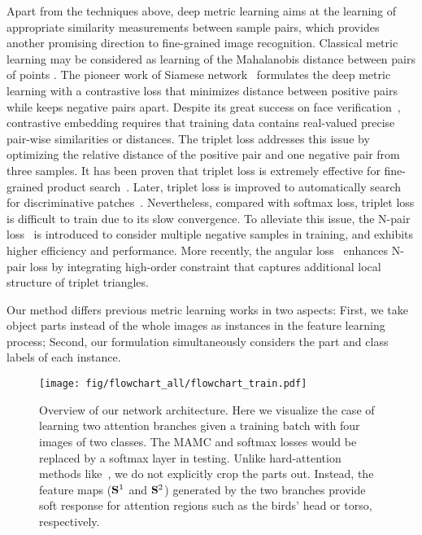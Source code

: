 \documentclass[runningheads]{llncs}
\begin{document}
Apart from the techniques above, deep metric learning aims at the learning of appropriate similarity measurements between sample pairs, which provides another promising direction to fine-grained image recognition.
Classical metric learning may be considered as learning of the Mahalanobis distance between pairs of points \cite{kulis2013metric}.
The pioneer work of Siamese network~\cite{bromley1994signature} formulates the deep metric learning with a contrastive loss that minimizes distance between positive pairs while keeps negative pairs apart.
Despite its great success on face verification~\cite{SchroffKP15}, contrastive embedding requires that training data contains real-valued precise pair-wise similarities or distances.
The triplet loss \cite{salakhutdinov2007learning} addresses this issue by optimizing the relative distance of the positive pair and one negative pair from three samples.
It has been proven that triplet loss is extremely effective for fine-grained product search~\cite{WangSLRWPCW14}.
Later, triplet loss is improved to automatically search for discriminative patches~\cite{wang2016mining}.
Nevertheless, compared with softmax loss, triplet loss is difficult to train due to its slow convergence.
To alleviate this issue, the N-pair loss~\cite{sohn2016improved} is introduced to consider multiple negative samples in training, and exhibits higher efficiency and performance.
More recently, the angular loss~\cite{wang2017deep} enhances N-pair loss by integrating high-order constraint that captures additional local structure of triplet triangles.

Our method differs previous metric learning works in two aspects:
First, we take object parts instead of the whole images as instances in the feature learning process;
Second, our formulation simultaneously considers the part and class labels of each instance.

\begin{figure*}[t]
  \centering
  \texttt{[image: fig/flowchart\_all/flowchart\_train.pdf]}
  \caption{Overview of our network architecture.
    Here we visualize the case of learning two attention branches given a training batch with four images of two classes.
    The MAMC and softmax losses would be replaced by a softmax layer in testing.
    Unlike hard-attention methods like~\cite{fu2017look}, we do not explicitly crop the parts out.
    Instead, the feature maps ($\mathbf{S}^1$ and $\mathbf{S}^2$) generated by the two branches provide soft response for attention regions such as the birds' head or torso, respectively.}
  \label{fig:flowchart_all}
\end{figure*}
\end{document}
